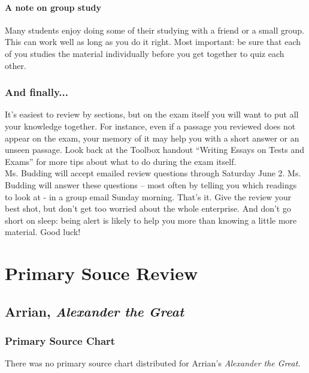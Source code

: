 \documentclass{article}
\begin{document}
    \paragraph{A note on group study}
    Many students enjoy doing some of their studying with a friend or a small group. This
    can work well as long as you do it right. Most important: be sure that each of you
    studies the material individually before you get together to quiz each other.
  \subsubsection{And finally...}
  It’s easiest to review by sections, but on the exam itself you will want to put all your
  knowledge together.  For instance, even if a passage you reviewed does not appear on
  the exam, your memory of it may help you with a short answer or an unseen passage.
  Look back at the Toolbox handout “Writing Essays on Tests and Exams” for more tips
  about what to do during the exam itself.  \\
  Ms. Budding will accept emailed review questions through Saturday June 2. Ms. Budding
  will answer these questions – most often by telling you which readings to look at - in a
  group email Sunday morning.  That’s it. Give the review your best shot, but don’t get too
  worried about the whole enterprise.   And don’t go short on sleep: being alert is likely to
  help you more than knowing a little more material.  Good luck!
\section{Primary Souce Review}
\subsection*{Arrian, \textit{Alexander the Great}}
\subsubsection*{Primary Source Chart}
There was no primary source chart distributed for Arrian's \textit{Alexander the Great}.
\end{document}
